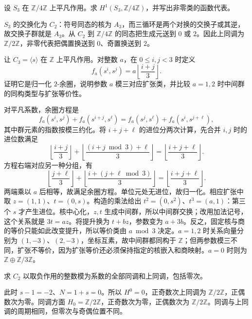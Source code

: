 \begin{exercise}\label{b4:ex:11-symmetric-first}
	设 \(S_3\) 在 \(\mathbb Z/4\mathbb Z\) 上平凡作用。求 \(H^1(S_3,\mathbb Z/4\mathbb Z)\)，并写出非零类的函数代表。
\end{exercise}
\begin{solution}
	\(S_3\) 的交换化为 \(C_2\)：符号同态的核为 \(A_3\)，而三循环是两个对换的交换子或其逆，故交换子群就是 \(A_3\)。从 \(C_2\) 到 \(\mathbb Z/4\mathbb Z\) 的同态把生成元送到 \(0\) 或 \(2\)。因此上同调为 \(\mathbb Z/2\mathbb Z\)，非零代表把偶置换送到 \(0\)、奇置换送到 \(2\)。
\end{solution}

\begin{exercise}\label{b4:ex:11-extension-carry}
	让 \(C_3=\langle s\rangle\) 在 \(\mathbb Z\) 上平凡作用。对整数 \(a\)，在 \(0\le i,j<3\) 时定义
	\[
		f_a(s^i,s^j)=a\left\lfloor\frac{i+j}{3}\right\rfloor.
	\]
	证明它是归一化 \(2\)-余圈，说明参数 \(a\) 模三对应扩张类，并比较 \(a=1,2\) 时中间群的同构类型与扩张等价性。
\end{exercise}
\begin{solution}
	对平凡系数，余圈方程是
	\[
		f_a(s^i,s^j)+f_a(s^{i+j},s^\ell) =f_a(s^j,s^\ell)+f_a(s^i,s^{j+\ell}),
	\]
	其中群元素的指数按模三约化。将 \(i+j+\ell\) 的进位分两次计算，先合并 \(i,j\) 时的进位数满足
	\[
		\left\lfloor\frac{i+j}{3}\right\rfloor+ \left\lfloor\frac{(i+j\bmod3)+\ell}{3}\right\rfloor =\left\lfloor\frac{i+j+\ell}{3}\right\rfloor.
	\]
	方程右端对应另一种分组，有
	\[
		\left\lfloor\frac{j+\ell}{3}\right\rfloor+ \left\lfloor\frac{i+(j+\ell\bmod3)}{3}\right\rfloor =\left\lfloor\frac{i+j+\ell}{3}\right\rfloor.
	\]
	两端乘以 \(a\) 后相等，故满足余圈方程。单位元处无进位，故归一化。相应扩张中取 \(z=(1,1)\)、\(t=(0,s)\)。构造的乘法给出 \(t^2=(0,s^2)\)、\(t^3=(a,1)\)：第三个 \(s\) 才产生进位。核中心化，\(z,t\) 生成中间群，所以中间群交换；改用加法记号，这个关系就是 \(3t=az\)。将提升换为 \(t+bz\)，参数变为 \(a+3b\)。反之，固定核与商的等价只能如此改变提升，所以等价类由 \(a\bmod3\) 决定。\(a=1,2\) 时关系向量分别为 \((1,-3)\)、\((2,-3)\)，坐标互素，故中间群都同构于 \(\mathbb Z\)；但两参数模三不同，扩张不等价，因为扩张等价还必须保持指定的核嵌入和商映射。\(a=0\) 时则为 \(\mathbb Z\oplus\mathbb Z/3\mathbb Z\)。
\end{solution}

\begin{exercise}\label{b4:ex:11-sign-all-degrees}
	求 \(C_2\) 以取负作用的整数模为系数的全部同调和上同调，包括零次。
\end{exercise}
\begin{solution}
	此时 \(s-1=-2\)、\(N=1+s=0\)。所以 \(H^0=0\)，正奇数次上同调为 \(\mathbb Z/2\mathbb Z\)，正偶数次为零。同调方面 \(H_0=\mathbb Z/2\mathbb Z\)，正奇数次为零，正偶数次为 \(\mathbb Z/2\mathbb Z\)。同调与上同调的周期相同，但零次与奇偶位置不同。
\end{solution}

